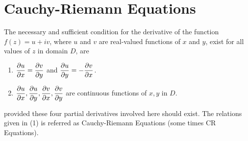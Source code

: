 \section{Cauchy-Riemann Equations}
\begin{theorem}
The necessary and sufficient condition for the derivative of the function $f(z)=u+iv$, where $u$ and $v$ are real-valued functions of $x$ and $y$, exist for all values of $z$ in domain $D$, are
\begin{enumerate}
        \item $\ds \pd ux = \pd vy$  and $\ds \pd uy = - \pd vx$. 
        \item $\ds \pd ux, \pd uy, \pd vx, \pd vy$ are continuous functions of $x, y$ in $D$.
\end{enumerate}
provided these four partial derivatives involved here should exist. The relations given in (1) is referred as Cauchy-Riemann Equations (some times CR Equations).
\end{theorem}
